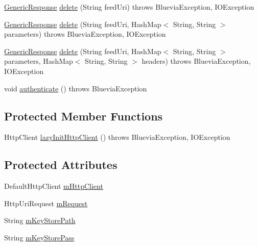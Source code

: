 \begin{DoxyCompactItemize}
\item 
\hyperlink{classcom_1_1bluevia_1_1commons_1_1connector_1_1GenericResponse}{GenericResponse} \hyperlink{classcom_1_1bluevia_1_1commons_1_1connector_1_1http_1_1HttpConnector_adfa48d184bcd477f8f59726b5353011d}{delete} (String feedUri)  throws BlueviaException, IOException 
\item 
\hyperlink{classcom_1_1bluevia_1_1commons_1_1connector_1_1GenericResponse}{GenericResponse} \hyperlink{classcom_1_1bluevia_1_1commons_1_1connector_1_1http_1_1HttpConnector_a8412605241cde6f85514389c3403aee5}{delete} (String feedUri, HashMap$<$ String, String $>$ parameters)  throws BlueviaException, IOException 
\item 
\hyperlink{classcom_1_1bluevia_1_1commons_1_1connector_1_1GenericResponse}{GenericResponse} \hyperlink{classcom_1_1bluevia_1_1commons_1_1connector_1_1http_1_1HttpConnector_af477b2e294c1ba02a3881855715be326}{delete} (String feedUri, HashMap$<$ String, String $>$ parameters, HashMap$<$ String, String $>$ headers)  throws BlueviaException, IOException 
\item 
void \hyperlink{classcom_1_1bluevia_1_1commons_1_1connector_1_1http_1_1HttpConnector_a6a3f418af48eb7df44ddef79763639bd}{authenticate} ()  throws BlueviaException 
\end{DoxyCompactItemize}
\subsection*{Protected Member Functions}
\begin{DoxyCompactItemize}
\item 
HttpClient \hyperlink{classcom_1_1bluevia_1_1commons_1_1connector_1_1http_1_1HttpConnector_a17ef811474aaf1187f879359377827fb}{lazyInitHttpClient} ()  throws BlueviaException, IOException 
\end{DoxyCompactItemize}
\subsection*{Protected Attributes}
\begin{DoxyCompactItemize}
\item 
DefaultHttpClient \hyperlink{classcom_1_1bluevia_1_1commons_1_1connector_1_1http_1_1HttpConnector_a0d03c843267a80eeb2f3b86be29b1a97}{mHttpClient}
\item 
HttpUriRequest \hyperlink{classcom_1_1bluevia_1_1commons_1_1connector_1_1http_1_1HttpConnector_ae32bdd8e1f3a245661b2388a85b024e4}{mRequest}
\item 
String \hyperlink{classcom_1_1bluevia_1_1commons_1_1connector_1_1http_1_1HttpConnector_a69806e8d34342d290c65d66ddd89f992}{mKeyStorePath}
\item 
String \hyperlink{classcom_1_1bluevia_1_1commons_1_1connector_1_1http_1_1HttpConnector_a9ebdd5dcdfcc73843812a33c07ef8b01}{mKeyStorePass}
\end{DoxyCompactItemize}


